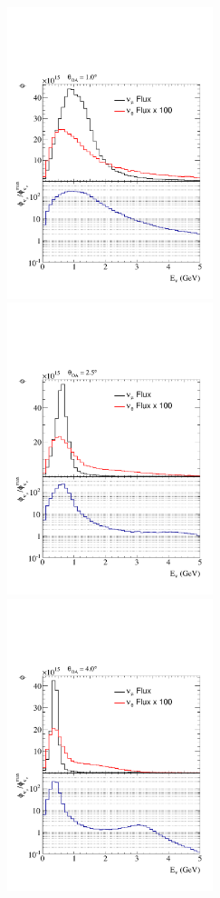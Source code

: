 \begin{figure}[htpb]
    \begin{center}
      \includegraphics[width=6cm] {figures/nuprism_numu_nue_1p0deg.pdf}
      \includegraphics[width=6cm] {figures/nuprism_numu_nue_2p5deg.pdf}
      \includegraphics[width=6cm] {figures/nuprism_numu_nue_4p0deg.pdf}

\end{center}
\end{figure}
